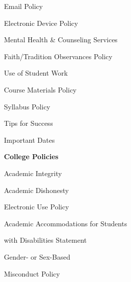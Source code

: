 \documentclass[11pt,letterpaper]{article}
\begin{document}
\begin{minipage}[t]{0.45\textwidth}
\hspace{0.3cm} Email Policy \dotfill \pageref{email_policy} \par
\hspace{0.3cm} Electronic Device Policy \dotfill \pageref{electronic} \par
%
\end{minipage}\hfill\begin{minipage}[t]{0.45\textwidth} \par
\hspace{0.3cm} Mental Health \& Counseling Services \dotfill \pageref{mental_health} \par
\hspace{0.3cm} Faith/Tradition Observances Policy \dotfill \pageref{faith} \par
\hspace{0.3cm} Use of Student Work \dotfill \pageref{std_work} \par
\hspace{0.3cm} Course Materials Policy \dotfill \pageref{copyright} \par
\hspace{0.3cm} Syllabus Policy \dotfill \pageref{syllabus} \par
\hspace{0.3cm} Tips for Success \dotfill \pageref{tips} \par
\hspace{0.3cm} Important Dates \dotfill \pageref{imp_dates} \par
{\bfseries\color{stacred} College Policies} \dotfill \pageref{college_polc} \par
\hspace{0.3cm} Academic Integrity \dotfill \pageref{college_acadint} \par
\hspace{0.3cm} Academic Dishonesty \dotfill \pageref{college_acaddis} \par
\hspace{0.3cm} Electronic Use Policy \dotfill \pageref{college_elecuse} \par
\hspace{0.3cm} Academic Accommodations for Students \par
\hspace{0.6cm} with Disabilities Statement \dotfill \pageref{college_acadacc} \par
\hspace{0.3cm} Gender- or Sex-Based \par
\hspace{0.6cm} Misconduct Policy \dotfill \pageref{college_sexmisconduct} \par

\end{minipage}
\end{document}
